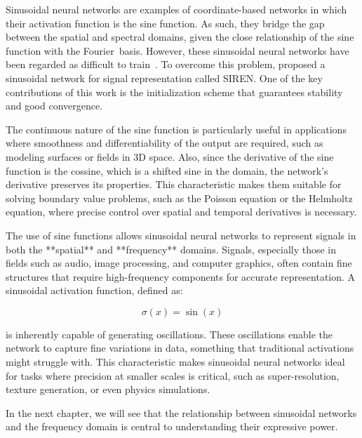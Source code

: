 Sinusoidal neural networks are examples of coordinate-based networks in which their activation function is the sine function. As such, they bridge the gap between the spatial and spectral domains, given the close relationship of the sine function with the Fourier~basis. However, these sinusoidal neural networks have been regarded as difficult to train~\cite{taming2017}. To overcome this problem, \citet{sitzmann2019siren} proposed a sinusoidal network for signal representation called SIREN. One of the key contributions of this work is the initialization scheme that guarantees stability and good convergence. 


The continuous nature of the sine function is particularly useful in applications where smoothness and differentiability of the output are required, such as modeling surfaces or fields in 3D space. Also, since the derivative of the sine function is the cossine, which is a shifted sine in the domain, the network's derivative preserves its properties. This characteristic makes them suitable for solving boundary value problems, such as the Poisson equation or the Helmholtz equation, where precise control over spatial and temporal derivatives is necessary.


The use of sine functions allows sinusoidal neural networks to represent signals in both the **spatial** and **frequency** domains. Signals, especially those in fields such as audio, image processing, and computer graphics, often contain fine structures that require high-frequency components for accurate representation. A sinusoidal activation function, defined as:

\[
\sigma(x) = \sin(x)
\]

is inherently capable of generating oscillations. These oscillations enable the network to capture fine variations in data, something that traditional activations might struggle with. This characteristic makes sinusoidal neural networks ideal for tasks where precision at smaller scales is critical, such as super-resolution, texture generation, or even physics simulations.

In the next chapter, we will see that the relationship between sinusoidal networks and the frequency domain is central to understanding their expressive power. 


